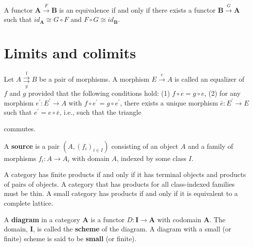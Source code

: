 \begin{prop}
    A functor $\mathbf{A} \xrightarrow{F} \mathbf{B}$ is an equivalence if and only if there exists a functor $\mathbf{B} \xrightarrow{G} \mathbf{A}$ such that $i d_{\mathbf{A}} \cong G \circ F$ and $F \circ G \cong i d_{\mathbf{B}}$.
\end{prop}


\section{Limits and colimits}
Let $A \stackrel{\text { f }}{\underset{g}{\rightrightarrows}} B$ be a pair of morphisms. A morphism $E \xrightarrow{e} A$ is called an equalizer of $f$ and $g$ provided that the following conditions hold:
(1) $f \circ e=g \circ e$,
(2) for any morphism $e^{\prime}: E^{\prime} \rightarrow A$ with $f \circ e^{\prime}=g \circ e^{\prime}$, there exists a unique morphism $\bar{e}: E^{\prime} \rightarrow E$ such that $e^{\prime}=e \circ \bar{e}$, i.e., such that the triangle
 commutes.
    

A \textbf{source} is a pair $\left(A,\left(f_i\right)_{i \in I}\right)$ consisting of an object $A$ and a family of morphisms $f_i: A \rightarrow A_i$ with domain $A$, indexed by some class $I$.


\begin{prop}
    A category has finite products if and only if it has terminal objects and products of pairs of objects.
    A category that has products for all class-indexed families must be thin.
A small category has products if and only if it is equivalent to a complete lattice.
\end{prop}

A \textbf{diagram} in a category $\mathbf{A}$ is a functor $D: \mathbf{I} \rightarrow \mathbf{A}$ with codomain $\mathbf{A}$. The domain, $\mathbf{I}$, is called the \textbf{scheme} of the diagram. A diagram with a small (or finite) scheme is said to be \textbf{small} (or finite).

